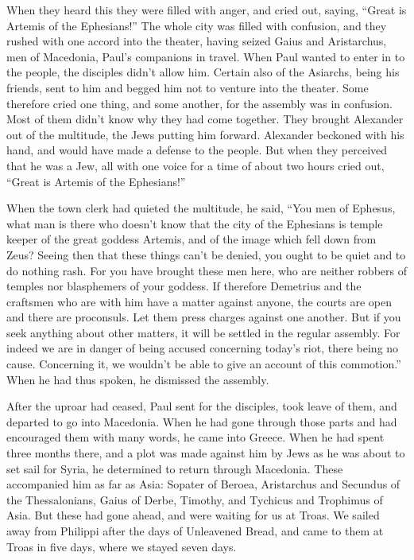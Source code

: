 \myverse{}When they heard this they were filled with anger, and cried
out, saying, “Great is Artemis of the Ephesians!”
\myverse{}The whole city was filled with confusion, and they rushed with one accord
into the theater, having seized Gaius and Aristarchus, men of Macedonia, Paul’s companions in travel.
\myverse{}When Paul wanted to enter in to the people, the disciples didn’t allow him.
\myverse{}Certain also of the Asiarchs, being his friends, sent to him and begged him
not to venture into the theater.
\myverse{}Some therefore cried one thing, and some another, for the assembly was in
confusion. Most of them didn’t know why they had come together.
\myverse{}They brought Alexander out of the multitude, the Jews putting him forward.
Alexander beckoned with his hand, and would have made a defense to the people.
\myverse{}But when they perceived that he was a Jew, all with one voice for a time
of about two hours cried out, “Great is Artemis of the Ephesians!”

\myverse{}When the town clerk had quieted the multitude, he said, “You
men of Ephesus, what man is there who doesn’t know that the city of the Ephesians is temple keeper of
the great goddess Artemis, and of the image which fell down from Zeus?
\myverse{}Seeing then that these things can’t be denied, you ought to be quiet and
to do nothing rash.
\myverse{}For you have brought these men here, who are neither robbers of temples nor
blasphemers of your goddess.
\myverse{}If therefore Demetrius and the craftsmen who are with him have a matter against
anyone, the courts are open and there are proconsuls. Let them press charges against one another.
\myverse{}But if you seek anything about other matters, it will be settled in the regular
assembly.
\myverse{}For indeed we are in danger of being accused concerning today’s riot, there
being no cause. Concerning it, we wouldn’t be able to give an account of this commotion.”
\myverse{}When he had thus spoken, he dismissed the assembly.


\mychapter{} \myverse*{}After the uproar had ceased, Paul sent for the disciples, took
leave of them, and departed to go into Macedonia.
\myverse{}When he had gone through those parts and had encouraged them with many words,
he came into Greece.
\myverse{}When he had spent three months there, and a plot was made against him by Jews
as he was about to set sail for Syria, he determined to return through Macedonia.
\myverse{}These accompanied him as far as Asia: Sopater of Beroea, Aristarchus and Secundus
of the Thessalonians, Gaius of Derbe, Timothy, and Tychicus and Trophimus of Asia.
\myverse{}But these had gone ahead, and were waiting for us at Troas.
\myverse{}We sailed away from Philippi after the days of Unleavened Bread, and came to
them at Troas in five days, where we stayed seven days.


